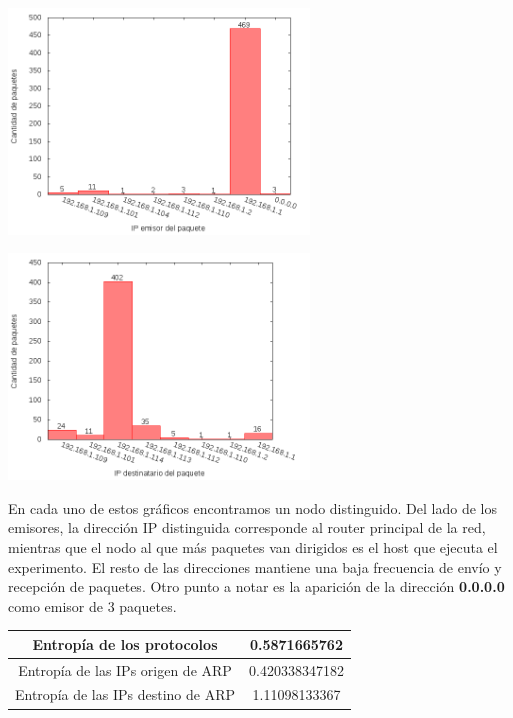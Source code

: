 \begin{minipage}{8cm}
  \centering
  \includegraphics[width=8cm]{../mediciones/home-wfi-10/home-wfi-10IpsSrcArp.png}
\end{minipage}%
\begin{minipage}{8cm}
  \centering
  \includegraphics[width=8cm]{../mediciones/home-wfi-10/home-wfi-10IpsDstArp.png}
\end{minipage}


En cada uno de estos gráficos encontramos un nodo distinguido. Del lado de los emisores, la dirección IP distinguida corresponde al
router principal de la red, mientras que el nodo al que más paquetes van dirigidos es el host que ejecuta el experimento. El resto
de las direcciones mantiene una baja frecuencia de envío y recepción de paquetes. Otro punto a notar es la aparición de la dirección
\textbf{0.0.0.0} como emisor de 3 paquetes.

\begin{center}
\begin{tabular}{|c||c|}
\hline
Entropía de los protocolos & 0.5871665762  \\
\hline
Entropía de las IPs origen de ARP & 0.420338347182  \\
\hline
Entropía de las IPs destino de ARP & 1.11098133367 \\
\hline
\end{tabular}
\end{center}


